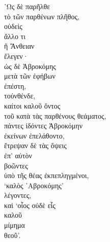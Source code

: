 {\large
\begin{greek}
\noindent ῾Ως δὲ παρῆλθε \\
τὸ τῶν παρθένων πλῆθος, \\
οὐδεὶς \\
\tabto{2em} ἄλλο τι \\
\tabto{2em} ἢ Ἄνθειαν \\
ἔλεγεν· \\
ὡς δὲ Ἁβροκόμης \\
\tabto{2em} μετὰ τῶν ἐφήβων \\
ἐπέστη, \\
τοὐνθένδε, \\
καίτοι καλοῦ ὄντος \\
\tabto{2em} τοῦ κατὰ τὰς παρθένους θεάματος, \\
πάντες ἰδόντες Ἁβροκόμην \\
ἐκείνων ἐπελάθοντο, \\
ἔτρεψαν δὲ τὰς ὄψεις \\
\tabto{2em} ἐπ' αὐτὸν \\
βοῶντες \\
\tabto{2em} ὑπὸ τῆς θέας ἐκπεπληγμένοι, \\
\tabto{2em} `καλὸς ῾Αβροκόμης'\\
λέγοντες, \\
καὶ `οἷος οὐδὲ εἷς \\
\tabto{4em} καλοῦ \\
\tabto{2em} μίμημα \\
\tabto{4em} θεοῦ'.\\

\end{greek}
}

